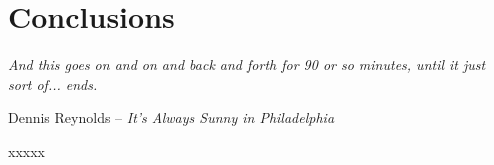 \chapter{Conclusions}

\epigraph{\textit{And this goes on and on and back and forth for 90 or so minutes, until it just sort of... ends.}}{Dennis Reynolds -- \textit{It's Always Sunny in Philadelphia}}

\vspace{1cm}

\par\noindent xxxxx